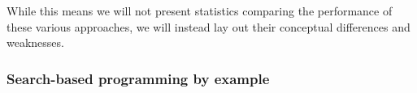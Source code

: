 \documentclass{article}
\begin{document}


While this means we will not present statistics
comparing the performance of these various approaches,
we will instead lay out their conceptual differences and weaknesses.

\subsubsection{Search-based programming by example}
\end{document}
